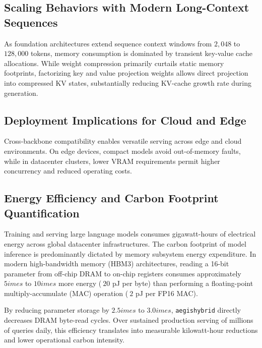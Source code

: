 \subsection{Scaling Behaviors with Modern Long-Context Sequences}
As foundation architectures extend sequence context windows from $2{,}048$ to $128{,}000$ tokens, memory consumption is dominated by transient key-value cache allocations. While weight compression primarily curtails static memory footprints, factorizing key and value projection weights allows direct projection into compressed KV states, substantially reducing KV-cache growth rate during generation.

\subsection{Deployment Implications for Cloud and Edge}
Cross-backbone compatibility enables versatile serving across edge and cloud environments. On edge devices, compact models avoid out-of-memory faults, while in datacenter clusters, lower VRAM requirements permit higher concurrency and reduced operating costs.

\subsection{Energy Efficiency and Carbon Footprint Quantification}
Training and serving large language models consumes gigawatt-hours of electrical energy across global datacenter infrastructures. The carbon footprint of model inference is predominantly dictated by memory subsystem energy expenditure. In modern high-bandwidth memory (HBM3) architectures, reading a 16-bit parameter from off-chip DRAM to on-chip registers consumes approximately $5	imes$ to $10	imes$ more energy ($~20$ pJ per byte) than performing a floating-point multiply-accumulate (MAC) operation ($~2$ pJ per FP16 MAC).

By reducing parameter storage by $2.5	imes$ to $3.0	imes$, \texttt{aegishybrid} directly decreases DRAM byte-read cycles. Over sustained production serving of millions of queries daily, this efficiency translates into measurable kilowatt-hour reductions and lower operational carbon intensity.
